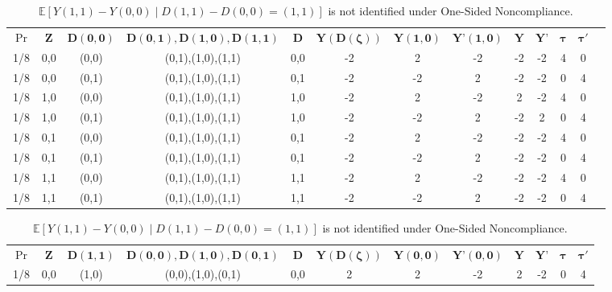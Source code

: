 \begin{table}[]
\centering
\caption{
  $\mathbb{E}[Y(1,0) - Y(0,0) \mid D(1,0)-D(0,0)=(1,0)]$ is not identified under (Sequential) Monotonicity.
}\label{tbl:non_ided_under_monotonicity}
\begin{tabular}{ccccccccccccc}
\rowcolor[HTML]{C0C0C0}
  $\Pr$
  & $\mathbf{Z}$
  & $\mathbf{D(0,0)}$
  & $\mathbf{D(0,1),D(1,0),D(1,1)}$
  & $\mathbf{D}$
  & $\mathbf{Y(D(\zeta))}$
  & $\mathbf{Y(1,0)}$
  & $\mathbf{Y’(1,0)}$
  & $\mathbf{Y}$
  & $\mathbf{Y’}$
  & $\mathbf{\tau}$
  & $\mathbf{\tau'}$ \\
1/8 & 0,0 & (0,0) & (0,1),(1,0),(1,1) & 0,0 & -2
    &  2 & -2 & -2 & -2 & 4 & 0     \\
1/8 & 0,0 & (0,1) & (0,1),(1,0),(1,1) & 0,1 & -2
    & -2 &  2 & -2 & -2 & 0 & 4     \\
1/8 & 1,0 & (0,0) & (0,1),(1,0),(1,1) & 1,0 & -2
    &  2 & -2
    &\cellcolor[HTML]{FFCC67} 2
    &\cellcolor[HTML]{FFCC67}-2
    & 4 & 0     \\
1/8 & 1,0 & (0,1) & (0,1),(1,0),(1,1) & 1,0 & -2
    & -2 &  2
    &\cellcolor[HTML]{FFCC67}-2
    &\cellcolor[HTML]{FFCC67} 2
    & 0 & 4 \\
1/8 & 0,1 & (0,0) & (0,1),(1,0),(1,1) & 0,1 & -2
    &  2 & -2 & -2 & -2 & 4 & 0     \\
1/8 & 0,1 & (0,1) & (0,1),(1,0),(1,1) & 0,1 & -2
    & -2 &  2 & -2 & -2 & 0 & 4     \\
1/8 & 1,1 & (0,0) & (0,1),(1,0),(1,1) & 1,1 & -2
    &  2 & -2 & -2 & -2 & 4 & 0     \\
1/8 & 1,1 & (0,1) & (0,1),(1,0),(1,1) & 1,1 & -2
    & -2 &  2 & -2 & -2 & 0 & 4     \\
\end{tabular}
\newline
\newline
\centering
\caption{
  $\mathbb{E}[Y(1,1)-Y(0,0) \mid D(1,1)-D(0,0) = (1,1)]$ is not identified under One-Sided Noncompliance.
}\label{tbl:non_ided_under_one_sided_noncompliance}
\begin{tabular}{cccccccccccc}
\rowcolor[HTML]{C0C0C0}
  $\Pr$
  & $\mathbf{Z}$
  & $\mathbf{D(1,1)}$
  & $\mathbf{D(0,0),D(1,0),D(0,1)}$
  & $\mathbf{D}$
  & $\mathbf{Y(D(\zeta))}$
  & $\mathbf{Y(0,0)}$
  & $\mathbf{Y’(0,0)}$
  & $\mathbf{Y}$
  & $\mathbf{Y’}$
  & $\mathbf{\tau}$ 
  & $\mathbf{\tau'}$ \\
1/8 & 0,0 & (1,0) & (0,0),(1,0),(0,1) & 0,0 & 2 &  2 & -2
    & \cellcolor[HTML]{FFCC67} 2
    & \cellcolor[HTML]{FFCC67}-2
    & 0 & 4                                            \\

\end{tabular}
\end{table}
